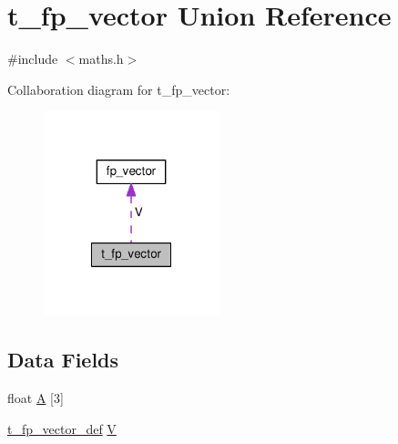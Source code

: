 \hypertarget{uniont__fp__vector}{\section{t\+\_\+fp\+\_\+vector Union Reference}
\label{uniont__fp__vector}
}


{\ttfamily \#include $<$maths.\+h$>$}



Collaboration diagram for t\+\_\+fp\+\_\+vector\+:\nopagebreak
\begin{figure}[H]
\begin{center}
\leavevmode
\includegraphics[width=144pt]{uniont__fp__vector__coll__graph}
\end{center}
\end{figure}
\subsection*{Data Fields}
\begin{DoxyCompactItemize}
\item 
float \hyperlink{uniont__fp__vector_a03cce9bae4093ec1380cc17ef7f3fa67}{A} \mbox{[}3\mbox{]}
\item 
\hyperlink{maths_8h_ad0649c60931904ba867e909c5cd2b41f}{t\+\_\+fp\+\_\+vector\+\_\+def} \hyperlink{uniont__fp__vector_aabdf935855b21c719a8216958297d54a}{V}
\end{DoxyCompactItemize}


